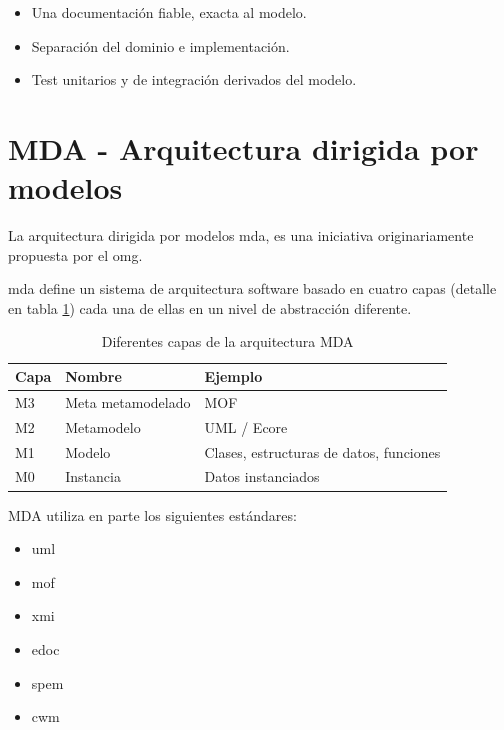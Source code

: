 \begin{itemize}

    \item Una documentación fiable, exacta al modelo.
    \item Separación del dominio e implementación.
    \item Test unitarios y de integración derivados del modelo.
\end{itemize}






\section{MDA - Arquitectura dirigida por modelos}

La arquitectura dirigida por modelos \gls{mda}, es una iniciativa originariamente propuesta por el \gls{omg}.

\gls{mda}  \cite{mda_distilled} define un sistema de arquitectura software basado en cuatro capas (detalle en tabla \ref{tab:capas_mda})  cada una de ellas en un nivel de abstracción diferente.

\begin{table}[]
\centering
\begin{tabular}{@{}lll@{}}
\toprule
Capa & Nombre            & Ejemplo                                 \\ \midrule
M3   & Meta metamodelado & MOF                                     \\
M2   & Metamodelo        & UML / Ecore                             \\
M1   & Modelo            & Clases, estructuras de datos, funciones \\
M0   & Instancia         & Datos instanciados                      \\ \bottomrule
\end{tabular}
\sourcepropia{}
\caption{Diferentes capas de la arquitectura MDA}
\label{tab:capas_mda}

\end{table}




MDA utiliza en parte los siguientes estándares: 
\begin{itemize}
    \item \gls{uml} \cite{uml}
    \item \gls{mof} \cite{mof}
    \item \gls{xmi} \cite{xmi}
    \item \gls{edoc} \cite{edoc}
    \item \gls{spem} \cite{spem}
    \item \gls{cwm} \cite{cwm}
\end{itemize}


